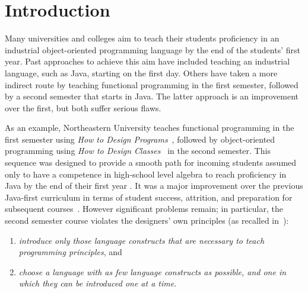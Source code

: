 \documentclass[submission,copyright]{eptcs}
\title{\thetitle}
\author{Sam Tobin-Hochstadt \quad\qquad David Van Horn
\institute{Northeastern University\\
Boston, Massachusetts, USA}
\email{\{samth,dvanhorn\}@ccs.neu.edu}
}
\begin{document}
\maketitle

\begin{abstract}
We propose a bridge between functional and object-oriented programming
in the first-year curriculum.
\end{abstract}

\section{Introduction}
\label{sec:intro}

Many universities and colleges aim to teach their students proficiency
in an industrial object-oriented programming language by the end of
the students' first year.  Past approaches to achieve this aim have
included teaching an industrial language, such as Java, starting on
the first day.  Others have taken a more indirect route by teaching
functional programming in the first semester, followed by a second
semester that starts in Java.  The latter approach is an improvement
over the first, but both suffer serious flaws.

As an example, Northeastern University teaches functional programming
in the first semester using \emph{How to Design
  Programs}~\cite{dvanhorn:Felleisen2001How}, followed by
object-oriented programming using \emph{How to Design
  Classes}~\cite{local:htdc} in the second semester.  This sequence
was designed to provide a smooth path for incoming students assumed
only to have a competence in high-school level algebra to reach
proficiency in Java by the end of their first year
\cite{dvanhorn:Felleisen2004Structure}.  It was a major improvement
over the previous Java-first curriculum in terms of student success,
attrition, and preparation for subsequent
courses~\cite{dvanhorn:Proulx2006Design}.  However significant
problems remain; in particular, the second semester course violates
the designers' own principles (as recalled
in~\cite{dvanhorn:Bloch2000Scheme}):
%
\begin{enumerate}
\item \emph{introduce only those language constructs that are necessary to
  teach programming principles}, and
\item \emph{choose a language with as
  few language constructs as possible, and one in which they can be
  introduced one at a time}.
\end{enumerate}
\end{document}
